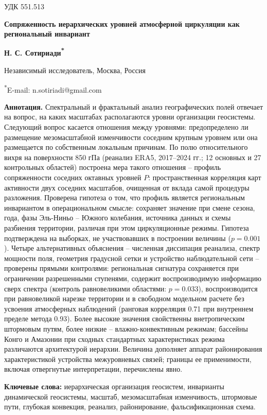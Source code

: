 \documentclass[12pt,a4paper]{article}
\begin{document}
\noindent УДК 551.513

\begin{center}
{\large\bfseries Сопряженность иерархических уровней атмосферной циркуляции как региональный инвариант}

\medskip
{\bfseries Н. С. Сотириади\textsuperscript{*}}

Независимый исследователь, Москва, Россия

\textsuperscript{*}E-mail: n.sotiriadi@gmail.com
\end{center}

\begin{singlespace}
\noindent\textbf{Аннотация.} Спектральный и фрактальный анализ географических полей отвечает на вопрос, на каких масштабах располагаются уровни организации геосистемы. Следующий вопрос касается отношения между уровнями: предопределено ли размещение мезомасштабной изменчивости соседним крупным уровнем или она размещается по собственным локальным причинам. По полю относительного вихря на поверхности 850 гПа (реанализ ERA5, 2017--2024 гг.; 12 основных и 27 контрольных областей) построена мера такого отношения -- профиль сопряженности соседних октавных уровней $P$: пространственная корреляция карт активности двух соседних масштабов, очищенная от вклада самой процедуры разложения. Проверена гипотеза о том, что профиль является региональным инвариантом в операциональном смысле: сохраняет значение при смене сезона, года, фазы Эль-Ниньо -- Южного колебания, источника данных и схемы разбиения территории, различая при этом циркуляционные режимы. Гипотеза подтверждена на выборках, не участвовавших в построении величины ($p = 0.001$). Четыре альтернативных объяснения -- численная диссипация реанализа, спектр мощности поля, геометрия градусной сетки и устройство наблюдательной сети -- проверены прямыми контролями: региональная сигнатура сохраняется при ограничении разрешенными ступенями, содержит воспроизводимую информацию сверх спектра (контроль равновеликими областями: $p = 0.033$), воспроизводится при равновеликой нарезке территории и в свободном модельном расчете без усвоения атмосферных наблюдений (ранговая корреляция 0.71 при внутреннем пределе метода 0.93). Более высокие значения свойственны внетропическим штормовым путям, более низкие -- влажно-конвективным режимам; бассейны Конго и Амазонии при сходных стандартных характеристиках режима различаются архитектурой иерархии. Величина дополняет аппарат районирования характеристикой устройства межуровневых связей; границы ее применимости, включая отвергнутые интерпретации, перечислены явно.

\smallskip
\noindent\textbf{Ключевые слова:} иерархическая организация геосистем, инварианты динамической геосистемы, масштаб, мезомасштабная изменчивость, штормовые пути, глубокая конвекция, реанализ, районирование, фальсификационная схема.
\end{singlespace}
\end{document}
